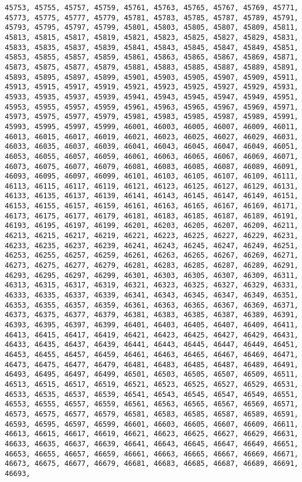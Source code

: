 \documentclass[11pt]{article}
\begin{document}
\begin{Verbatim}[commandchars=\\\{\}]
45753, 45755, 45757, 45759, 45761, 45763, 45765, 45767, 45769, 45771, 45773, 45775, 45777, 45779, 45781, 45783, 45785, 45787, 45789, 45791, 45793, 45795, 45797, 45799, 45801, 45803, 45805, 45807, 45809, 45811, 45813, 45815, 45817, 45819, 45821, 45823, 45825, 45827, 45829, 45831, 45833, 45835, 45837, 45839, 45841, 45843, 45845, 45847, 45849, 45851, 45853, 45855, 45857, 45859, 45861, 45863, 45865, 45867, 45869, 45871, 45873, 45875, 45877, 45879, 45881, 45883, 45885, 45887, 45889, 45891, 45893, 45895, 45897, 45899, 45901, 45903, 45905, 45907, 45909, 45911, 45913, 45915, 45917, 45919, 45921, 45923, 45925, 45927, 45929, 45931, 45933, 45935, 45937, 45939, 45941, 45943, 45945, 45947, 45949, 45951, 45953, 45955, 45957, 45959, 45961, 45963, 45965, 45967, 45969, 45971, 45973, 45975, 45977, 45979, 45981, 45983, 45985, 45987, 45989, 45991, 45993, 45995, 45997, 45999, 46001, 46003, 46005, 46007, 46009, 46011, 46013, 46015, 46017, 46019, 46021, 46023, 46025, 46027, 46029, 46031, 46033, 46035, 46037, 46039, 46041, 46043, 46045, 46047, 46049, 46051, 46053, 46055, 46057, 46059, 46061, 46063, 46065, 46067, 46069, 46071, 46073, 46075, 46077, 46079, 46081, 46083, 46085, 46087, 46089, 46091, 46093, 46095, 46097, 46099, 46101, 46103, 46105, 46107, 46109, 46111, 46113, 46115, 46117, 46119, 46121, 46123, 46125, 46127, 46129, 46131, 46133, 46135, 46137, 46139, 46141, 46143, 46145, 46147, 46149, 46151, 46153, 46155, 46157, 46159, 46161, 46163, 46165, 46167, 46169, 46171, 46173, 46175, 46177, 46179, 46181, 46183, 46185, 46187, 46189, 46191, 46193, 46195, 46197, 46199, 46201, 46203, 46205, 46207, 46209, 46211, 46213, 46215, 46217, 46219, 46221, 46223, 46225, 46227, 46229, 46231, 46233, 46235, 46237, 46239, 46241, 46243, 46245, 46247, 46249, 46251, 46253, 46255, 46257, 46259, 46261, 46263, 46265, 46267, 46269, 46271, 46273, 46275, 46277, 46279, 46281, 46283, 46285, 46287, 46289, 46291, 46293, 46295, 46297, 46299, 46301, 46303, 46305, 46307, 46309, 46311, 46313, 46315, 46317, 46319, 46321, 46323, 46325, 46327, 46329, 46331, 46333, 46335, 46337, 46339, 46341, 46343, 46345, 46347, 46349, 46351, 46353, 46355, 46357, 46359, 46361, 46363, 46365, 46367, 46369, 46371, 46373, 46375, 46377, 46379, 46381, 46383, 46385, 46387, 46389, 46391, 46393, 46395, 46397, 46399, 46401, 46403, 46405, 46407, 46409, 46411, 46413, 46415, 46417, 46419, 46421, 46423, 46425, 46427, 46429, 46431, 46433, 46435, 46437, 46439, 46441, 46443, 46445, 46447, 46449, 46451, 46453, 46455, 46457, 46459, 46461, 46463, 46465, 46467, 46469, 46471, 46473, 46475, 46477, 46479, 46481, 46483, 46485, 46487, 46489, 46491, 46493, 46495, 46497, 46499, 46501, 46503, 46505, 46507, 46509, 46511, 46513, 46515, 46517, 46519, 46521, 46523, 46525, 46527, 46529, 46531, 46533, 46535, 46537, 46539, 46541, 46543, 46545, 46547, 46549, 46551, 46553, 46555, 46557, 46559, 46561, 46563, 46565, 46567, 46569, 46571, 46573, 46575, 46577, 46579, 46581, 46583, 46585, 46587, 46589, 46591, 46593, 46595, 46597, 46599, 46601, 46603, 46605, 46607, 46609, 46611, 46613, 46615, 46617, 46619, 46621, 46623, 46625, 46627, 46629, 46631, 46633, 46635, 46637, 46639, 46641, 46643, 46645, 46647, 46649, 46651, 46653, 46655, 46657, 46659, 46661, 46663, 46665, 46667, 46669, 46671, 46673, 46675, 46677, 46679, 46681, 46683, 46685, 46687, 46689, 46691, 46693, 
\end{Verbatim}
\end{document}

